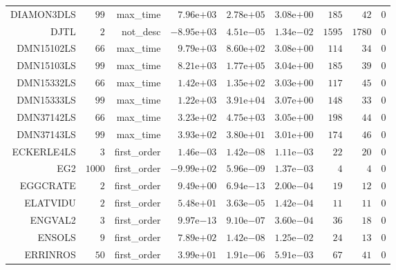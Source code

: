 \begin{longtable}{rrrrrrrrr}
DIAMON3DLS & \(    99\) & max\_time & \( 7.96\)e\(+03\) & \( 2.78\)e\(+05\) & \( 3.08\)e\(+00\) & \(   185\) & \(    42\) & \(     0\) \\
DJTL & \(     2\) & not\_desc & \(-8.95\)e\(+03\) & \( 4.51\)e\(-05\) & \( 1.34\)e\(-02\) & \(  1595\) & \(  1780\) & \(     0\) \\
DMN15102LS & \(    66\) & max\_time & \( 9.79\)e\(+03\) & \( 8.60\)e\(+02\) & \( 3.08\)e\(+00\) & \(   114\) & \(    34\) & \(     0\) \\
DMN15103LS & \(    99\) & max\_time & \( 8.21\)e\(+03\) & \( 1.77\)e\(+05\) & \( 3.04\)e\(+00\) & \(   185\) & \(    39\) & \(     0\) \\
DMN15332LS & \(    66\) & max\_time & \( 1.42\)e\(+03\) & \( 1.35\)e\(+02\) & \( 3.03\)e\(+00\) & \(   117\) & \(    45\) & \(     0\) \\
DMN15333LS & \(    99\) & max\_time & \( 1.22\)e\(+03\) & \( 3.91\)e\(+04\) & \( 3.07\)e\(+00\) & \(   148\) & \(    33\) & \(     0\) \\
DMN37142LS & \(    66\) & max\_time & \( 3.23\)e\(+02\) & \( 4.75\)e\(+03\) & \( 3.05\)e\(+00\) & \(   198\) & \(    44\) & \(     0\) \\
DMN37143LS & \(    99\) & max\_time & \( 3.93\)e\(+02\) & \( 3.80\)e\(+01\) & \( 3.01\)e\(+00\) & \(   174\) & \(    46\) & \(     0\) \\
ECKERLE4LS & \(     3\) & first\_order & \( 1.46\)e\(-03\) & \( 1.42\)e\(-08\) & \( 1.11\)e\(-03\) & \(    22\) & \(    20\) & \(     0\) \\
EG2 & \(  1000\) & first\_order & \(-9.99\)e\(+02\) & \( 5.96\)e\(-09\) & \( 1.37\)e\(-03\) & \(     4\) & \(     4\) & \(     0\) \\
EGGCRATE & \(     2\) & first\_order & \( 9.49\)e\(+00\) & \( 6.94\)e\(-13\) & \( 2.00\)e\(-04\) & \(    19\) & \(    12\) & \(     0\) \\
ELATVIDU & \(     2\) & first\_order & \( 5.48\)e\(+01\) & \( 3.63\)e\(-05\) & \( 1.42\)e\(-04\) & \(    11\) & \(    11\) & \(     0\) \\
ENGVAL2 & \(     3\) & first\_order & \( 9.97\)e\(-13\) & \( 9.10\)e\(-07\) & \( 3.60\)e\(-04\) & \(    36\) & \(    18\) & \(     0\) \\
ENSOLS & \(     9\) & first\_order & \( 7.89\)e\(+02\) & \( 1.42\)e\(-08\) & \( 1.25\)e\(-02\) & \(    24\) & \(    13\) & \(     0\) \\
ERRINROS & \(    50\) & first\_order & \( 3.99\)e\(+01\) & \( 1.91\)e\(-06\) & \( 5.91\)e\(-03\) & \(    67\) & \(    41\) & \(     0\) \\

\end{longtable}
